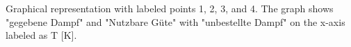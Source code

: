 Graphical representation with labeled points 1, 2, 3, and 4. The graph shows "gegebene Dampf" and "Nutzbare Güte" with "unbestellte Dampf" on the x-axis labeled as T [K].